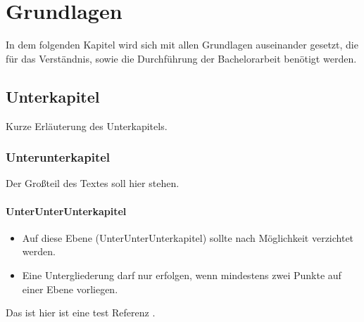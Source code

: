\chapter{Grundlagen}
\label{cha:grundlagen}

In dem folgenden Kapitel wird sich mit allen Grundlagen auseinander gesetzt, die f\"ur das Verst\"andnis, sowie die Durchf\"uhrung der Bachelorarbeit ben\"otigt werden.

\section{Unterkapitel}

Kurze Erl\"auterung des Unterkapitels.

\subsection{Unterunterkapitel}

Der Gro{\ss}teil des Textes soll hier stehen.

\subsubsection{UnterUnterUnterkapitel}

\begin{itemize}
  \item Auf diese Ebene (UnterUnterUnterkapitel) sollte nach M\"oglichkeit verzichtet werden.
  \item Eine Untergliederung darf nur erfolgen, wenn mindestens zwei Punkte auf einer Ebene vorliegen.
\end{itemize}

Das ist hier ist eine test Referenz \cite{SalmangScholze}.
